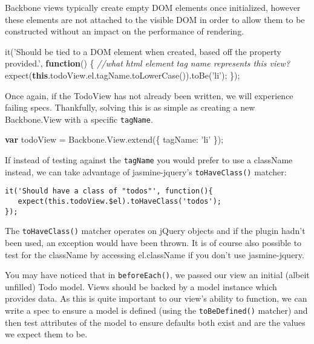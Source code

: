 \documentclass[9pt]{book}
\newenvironment{Shaded}{}{}
\newcommand{\KeywordTok}[1]{\textcolor[rgb]{0.00,0.44,0.13}{\textbf{{#1}}}}
\newcommand{\DataTypeTok}[1]{\textcolor[rgb]{0.56,0.13,0.00}{{#1}}}
\newcommand{\StringTok}[1]{\textcolor[rgb]{0.25,0.44,0.63}{{#1}}}
\newcommand{\CommentTok}[1]{\textcolor[rgb]{0.38,0.63,0.69}{\textit{{#1}}}}
\newcommand{\OtherTok}[1]{\textcolor[rgb]{0.00,0.44,0.13}{{#1}}}
\newcommand{\FunctionTok}[1]{\textcolor[rgb]{0.02,0.16,0.49}{{#1}}}
\newcommand{\NormalTok}[1]{{#1}}
\begin{document}
Backbone views typically create empty DOM elements once initialized,
however these elements are not attached to the visible DOM in order to
allow them to be constructed without an impact on the performance of
rendering.

\begin{Shaded}
\begin{Highlighting}[]
\FunctionTok{it}\NormalTok{(}\StringTok{'Should be tied to a DOM element when created, based off the property provided.'}\NormalTok{, }\KeywordTok{function}\NormalTok{() \{}
    \CommentTok{//what html element tag name represents this view?}
    \FunctionTok{expect}\NormalTok{(}\KeywordTok{this}\NormalTok{.}\OtherTok{todoView}\NormalTok{.}\OtherTok{el}\NormalTok{.}\OtherTok{tagName}\NormalTok{.}\FunctionTok{toLowerCase}\NormalTok{()).}\FunctionTok{toBe}\NormalTok{(}\StringTok{'li'}\NormalTok{);}
\NormalTok{\});}
\end{Highlighting}
\end{Shaded}

Once again, if the TodoView has not already been written, we will
experience failing specs. Thankfully, solving this is as simple as
creating a new Backbone.View with a specific \texttt{tagName}.

\begin{Shaded}
\begin{Highlighting}[]
\KeywordTok{var} \NormalTok{todoView = }\OtherTok{Backbone}\NormalTok{.}\OtherTok{View}\NormalTok{.}\FunctionTok{extend}\NormalTok{(\{}
    \DataTypeTok{tagName}\NormalTok{:  }\StringTok{'li'}
\NormalTok{\});}
\end{Highlighting}
\end{Shaded}

If instead of testing against the \texttt{tagName} you would prefer to
use a className instead, we can take advantage of jasmine-jquery's
\texttt{toHaveClass()} matcher:

\begin{verbatim}
it('Should have a class of "todos"', function(){
   expect(this.todoView.$el).toHaveClass('todos');
});
\end{verbatim}

The \texttt{toHaveClass()} matcher operates on jQuery objects and if the
plugin hadn't been used, an exception would have been thrown. It is of
course also possible to test for the className by accessing el.className
if you don't use jasmine-jquery.

You may have noticed that in \texttt{beforeEach()}, we passed our view
an initial (albeit unfilled) Todo model. Views should be backed by a
model instance which provides data. As this is quite important to our
view's ability to function, we can write a spec to ensure a model is
defined (using the \texttt{toBeDefined()} matcher) and then test
attributes of the model to ensure defaults both exist and are the values
we expect them to be.
\end{document}
